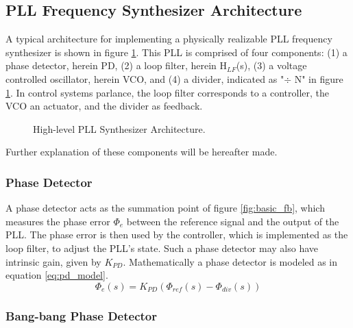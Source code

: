	\subsection{PLL Frequency Synthesizer Architecture}
		A typical architecture for implementing a physically realizable PLL frequency synthesizer \cite{Razavi1996DesignOM} is shown in figure \ref{fig:basic_pll}. This PLL is comprised of four components: (1) a phase detector, herein PD, (2) a loop filter, herein H$_{LF}$(s), (3) a voltage controlled oscillator, herein VCO, and (4) a divider, indicated as "$\div$ N" in figure \ref{fig:basic_pll}. In control systems parlance, the loop filter corresponds to a controller, the VCO an actuator, and the divider as feedback.
		\begin{figure}[htb!]
			\center
			\caption{High-level PLL Synthesizer Architecture.}
			\label{fig:basic_pll}
		\end{figure}
		\FloatBarrier
		Further explanation of these components will be hereafter made.

		\subsubsection{Phase Detector}
		A phase detector acts as the summation point of figure \ref{fig:basic_fb}, which measures the phase error $\Phi_e$ between the reference signal and the output of the PLL. The phase error is then used by the controller, which is implemented as the loop filter, to adjust the PLL's state. Such a phase detector may also have intrinsic gain, given by $K_{PD}$. Mathematically a phase detector is modeled as in equation \ref{eq:pd_model}.
		\begin{equation}\label{eq:pd_model}
			\Phi_e(s) = K_{PD}(\Phi_{ref}(s) - \Phi_{div}(s))
		\end{equation}

		\subsubsection{Bang-bang Phase Detector}\label{bbpd_theory}

